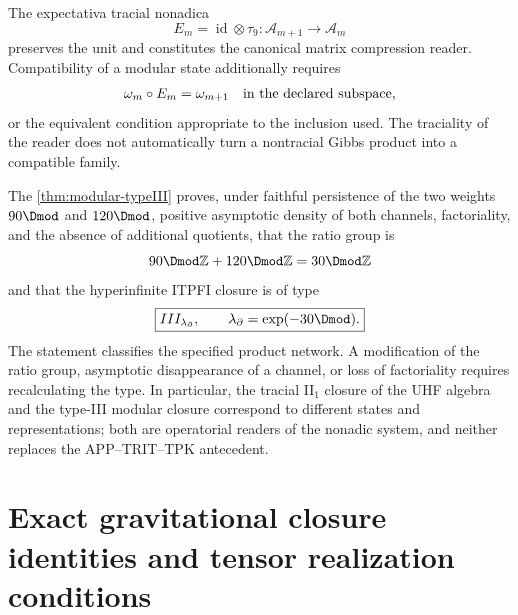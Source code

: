 The expectativa tracial nonadica
\begin{equation}
 E_m=\operatorname{id}\otimes\tau_9:
 \mathcal A_{m+1}\longrightarrow\mathcal A_m
 \label{eq:rm-info-tracial-expectation}
\end{equation}
preserves the unit and constitutes the canonical matrix
compression reader. Compatibility of a modular state additionally requires
\begin{equation}
 \omega_m\circ E_m=\omega_{m+1}
 \quad\hbox{in the declared subspace,}
 \label{eq:rm-info-expectation-state}
\end{equation}
or the equivalent condition appropriate to the inclusion used. The
traciality of the reader does not automatically turn a nontracial Gibbs product into
a compatible family.

The \cref{thm:modular-typeIII} proves, under faithful persistence of the two
weights \(90\Dmod\) and \(120\Dmod\), positive asymptotic density of both
channels, factoriality, and the absence of additional quotients, that the ratio
group is
\begin{equation}
 90\Dmod\mathbb Z+120\Dmod\mathbb Z
 =30\Dmod\mathbb Z
 \label{eq:rm-info-ratio-group}
\end{equation}
and that the hyperinfinite ITPFI closure is of type
\begin{equation}
 \boxed{
 III_{\lambda_\partial},
 \qquad
 \lambda_\partial=\exp(-30\Dmod).}
 \label{eq:rm-info-type-iii}
\end{equation}
The statement classifies the specified product network. A modification of the
ratio group, asymptotic disappearance of a channel, or loss of
factoriality requires recalculating the type. In particular, the tracial
II\(_1\) closure of the UHF algebra and the type-III modular closure correspond to different states and
representations; both are operatorial readers of the
nonadic system, and neither replaces the APP--TRIT--TPK antecedent.

\section{Exact gravitational closure identities and tensor realization conditions}

